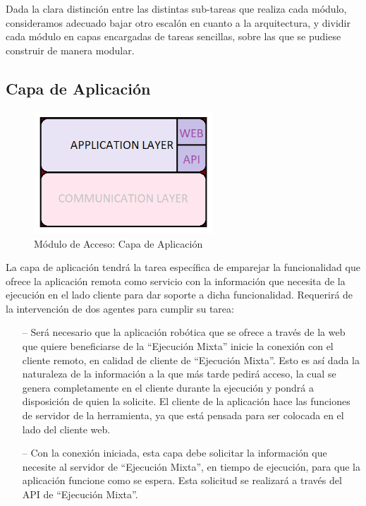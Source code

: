 Dada la clara distinción entre las distintas sub-tareas que realiza cada módulo, consideramos adecuado bajar otro escalón en cuanto a la arquitectura, y dividir cada módulo en capas encargadas de tareas sencillas, sobre las que se pudiese construir de manera modular. 

\subsection{Capa de Aplicación}

\begin{figure}[!hbtp]  \centering\noindent
    \includegraphics[width=0.6\textwidth]{figures/layer4.png}
    \caption{Módulo de Acceso: Capa de Aplicación}
    \label{layer4}
\end{figure}

La capa de aplicación tendrá la tarea específica de emparejar la funcionalidad que ofrece la aplicación remota como servicio con la información que necesita de la ejecución en el lado cliente para dar soporte a dicha funcionalidad. Requerirá de la intervención de dos agentes para cumplir su tarea:

\begin{itemize}
    \item [--] Será necesario que la aplicación robótica que se ofrece a través de la web que quiere beneficiarse de la ``Ejecución Mixta'' inicie la conexión con el cliente remoto, en calidad de cliente de ``Ejecución Mixta''. Esto es así dada la naturaleza de la información a la que más tarde pedirá acceso, la cual se genera completamente en el cliente durante la ejecución y pondrá a disposición de quien la solicite. El cliente de la aplicación hace las funciones de servidor de la herramienta, ya que está pensada para ser colocada en el lado del cliente web.
    \item [--] Con la conexión iniciada, esta capa debe solicitar la información que necesite al servidor de ``Ejecución Mixta'', en tiempo de ejecución, para que la aplicación funcione como se espera. Esta solicitud se realizará a través del API de ``Ejecución Mixta''.
\end{itemize}

